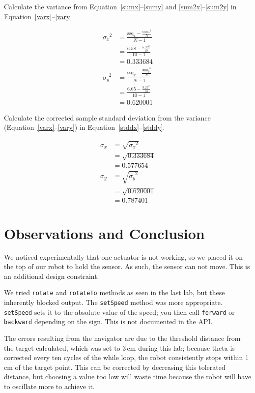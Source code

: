 \documentclass[twocolumn]{article}
\begin{document}
Calculate the variance from Equation~\ref{sumx}--\ref{sumy} and \ref{sum2x}--\ref{sum2y} in Equation~\ref{varx}--\ref{vary}.

\begin{align}
\sigma_{x}^{\phantom{x}2} &= \frac{\text{ssq}_{x} - \frac{\text{sum}_{x}^{\phantom{x}2}}{N}}{N-1} \nonumber\\
 &= \frac{6.58 - \frac{5.98^2}{10}}{10-1} \nonumber\\
 &= 0.333684 \label{varx}\\
\sigma_{y}^{\phantom{y}2} &= \frac{\text{ssq}_{y} - \frac{\text{sum}_{y}^{\phantom{y}2}}{N}}{N-1} \nonumber\\
 &= \frac{6.65 - \frac{3.27^2}{10}}{10-1} \nonumber\\
 &= 0.620001 \label{vary}
\end{align}

Calculate the corrected sample standard deviation from the variance (Equation~\ref{varx}--\ref{vary}) in Equation~\ref{stddx}--\ref{stddy}.

\begin{align}
\sigma_x &= \sqrt{\sigma_{x}^{\phantom{x}2}} \nonumber\\
 &= \sqrt{0.333684} \nonumber\\
 &= 0.577654 \label{stddx}\\
\sigma_y &= \sqrt{\sigma_{y}^{\phantom{y}2}} \nonumber\\
 &= \sqrt{0.620001} \nonumber\\
 &= 0.787401 \label{stddy}
\end{align}

\section{Observations and Conclusion}

We noticed experimentally that one actuator is not working, so we placed it on the top of our robot to hold the sensor. As such, the sensor can not move. This is an additional design constraint.

We tried {\tt rotate} and {\tt rotateTo} methods as seen in the last lab\cite{alexneil2}, but these inherently blocked output. The {\tt setSpeed} method was more appropriate. {\tt setSpeed} sets it to the absolute value of the speed; you then call {\tt forward} or {\tt backward} depending on the sign. This is not documented in the API.

The errors resulting from the navigator are due to the threshold distance from the target calculated, which was set to 3\,cm during this lab; because theta is corrected every ten cycles of the while loop, the robot consistently stops within 1\,cm of the target point. This can be corrected by decreasing this tolerated distance, but choosing a value too low will waste time because the robot will have to oscillate more to achieve it.
\end{document}
